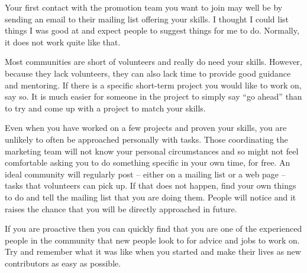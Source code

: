 Your first contact with the promotion team you want to join may well be by
sending an email to their mailing list offering your skills. I thought I could
list things I was good at and expect people to suggest things for me to do.
Normally, it does not work quite like that.

Most communities are short of volunteers and really do need your skills.
However, because they lack volunteers, they can also lack time to provide good
guidance and mentoring. If there is a specific short-term project you would like
to work on, say so. It is much easier for someone in the project to simply say
``go ahead'' than to try and come up with a project to match your skills.

Even when you have worked on a few projects and proven your skills, you are
unlikely to often be approached personally with tasks. Those coordinating the
marketing team will not know your personal circumstances and so might not feel
comfortable asking you to do something specific in your own time, for free. An
ideal community will regularly post -- either on a mailing list or a web page --
tasks that volunteers can pick up. If that does not happen, find your own things
to do and tell the mailing list that you are doing them. People will notice and
it raises the chance that you will be directly approached in future.

If you are proactive then you can quickly find that you are one of the
experienced people in the community that new people look to for advice and jobs
to work on. Try and remember what it was like when you started and make their
lives as new contributors as easy as possible.
